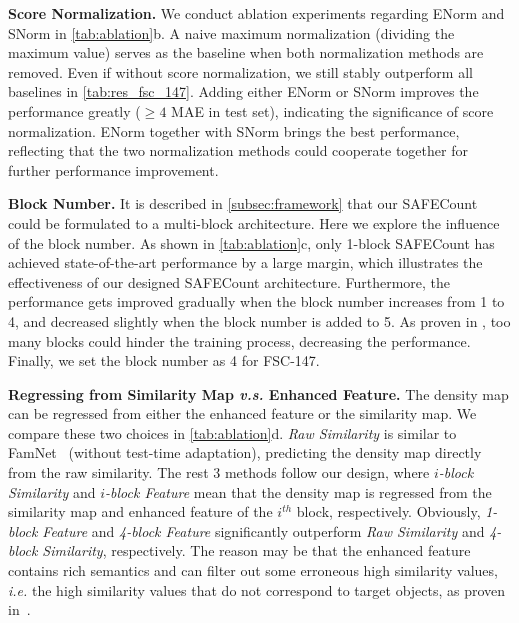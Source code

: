 \documentclass[10pt,twocolumn,letterpaper]{article}
\newcommand{\method}{SAFECount\xspace}
\begin{document}
\vspace{2pt}\noindent \textbf{Score Normalization.} 
We conduct ablation experiments regarding ENorm and SNorm in \cref{tab:ablation}b. 
A naive maximum normalization (dividing the maximum value) serves as the baseline when both normalization methods are removed. 
Even if without score normalization, we still stably outperform all baselines in \cref{tab:res_fsc_147}.  
Adding either ENorm or SNorm improves the performance greatly ($\geq 4$ MAE in test set), indicating the significance of score normalization. 
ENorm together with SNorm brings the best performance, reflecting that the two normalization methods could cooperate together for further performance improvement. 


\vspace{2pt}\noindent \textbf{Block Number.} 
It is described in \cref{subsec:framework} that our \method could be formulated to a multi-block architecture. 
Here we explore the influence of the block number. 
As shown in \cref{tab:ablation}c, only 1-block \method has achieved state-of-the-art performance by a large margin, which illustrates the effectiveness of our designed \method architecture. 
Furthermore, the performance gets improved gradually when the block number increases from 1 to 4, and decreased slightly when the block number is added to 5. 
As proven in \cite{resnet}, too many blocks could hinder the training process, decreasing the performance. Finally, we set the block number as 4 for FSC-147. 


\vspace{-2pt} \noindent \textbf{Regressing from Similarity Map \textit{v.s.} Enhanced Feature.}  
The density map can be regressed from either the enhanced feature or the similarity map. 
We compare these two choices in \cref{tab:ablation}d. 
\textit{Raw Similarity} is similar to FamNet~\cite{famnet} (without test-time adaptation), predicting the density map directly from the raw similarity. 
The rest 3 methods follow our design, where \textit{$i$-block Similarity} and \textit{$i$-block Feature} mean that the density map is regressed from the similarity map and enhanced feature of the $i^{th}$ block, respectively. 
Obviously, \textit{1-block Feature} and \textit{4-block Feature} significantly outperform \textit{Raw Similarity} and \textit{4-block Similarity}, respectively. 
The reason may be that the enhanced feature contains rich semantics and can filter out some erroneous high similarity values, \textit{i.e.} the high similarity values that do not correspond to target objects, as proven in~\cite{pwcnet}. 
\end{document}
